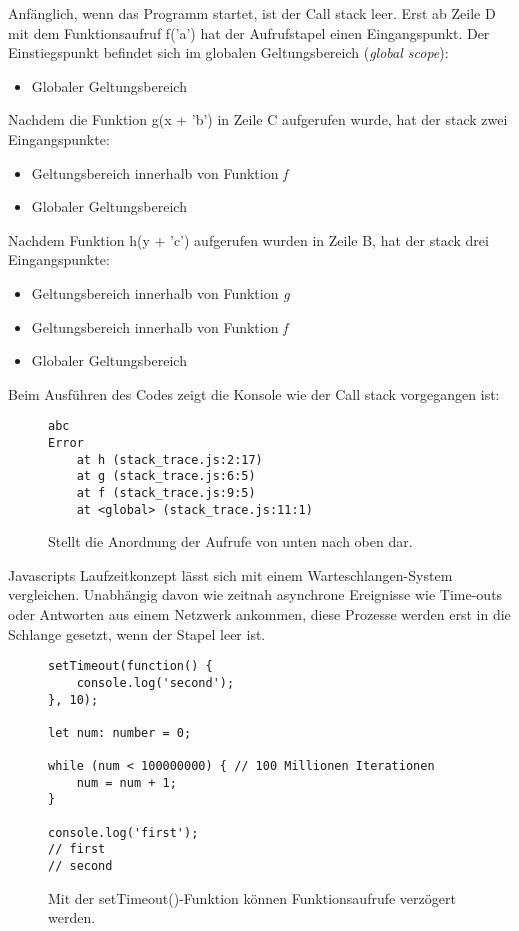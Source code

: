 \noindent
Anfänglich, wenn das Programm startet, ist der Call stack leer. Erst ab Zeile D mit dem Funktionsaufruf f('a') hat der Aufrufstapel einen Eingangspunkt. Der Einstiegspunkt befindet sich im globalen Geltungsbereich (\textit{global scope}):

\begin{itemize}
\item Globaler Geltungsbereich
\end{itemize}

\noindent
Nachdem die Funktion g(x + 'b') in Zeile C aufgerufen wurde, hat der stack zwei Eingangspunkte:

\begin{itemize}
\item Geltungsbereich innerhalb von Funktion \textit{f}
\item Globaler Geltungsbereich
\end{itemize}

\noindent
Nachdem Funktion h(y + 'c') aufgerufen wurden in Zeile B, hat der stack drei Eingangspunkte:

\begin{itemize}
\item Geltungsbereich innerhalb von Funktion \textit{g}
\item Geltungsbereich innerhalb von Funktion \textit{f}
\item Globaler Geltungsbereich
\end{itemize}

\noindent
Beim Ausführen des Codes zeigt die Konsole wie der Call stack vorgegangen ist:

\begin{figure}[H]
\begin{lstlisting}
abc
Error
    at h (stack_trace.js:2:17)
    at g (stack_trace.js:6:5)
    at f (stack_trace.js:9:5)
    at <global> (stack_trace.js:11:1)
\end{lstlisting}
\caption{Stellt die Anordnung der Aufrufe von unten nach oben dar.}
\label{stack-trace-error}
\end{figure}

\noindent
Javascripts Laufzeitkonzept lässt sich mit einem Warteschlangen-System vergleichen. Unabhängig davon wie zeitnah asynchrone Ereignisse wie Time-outs oder Antworten aus einem Netzwerk ankommen, diese Prozesse werden erst in die Schlange gesetzt, wenn der Stapel leer ist.

\begin{figure}[H]
\begin{lstlisting}[basicstyle=\small]
setTimeout(function() {
    console.log('second');
}, 10);

let num: number = 0;

while (num < 100000000) { // 100 Millionen Iterationen
    num = num + 1;
}

console.log('first');
// first
// second
\end{lstlisting}
\caption{Mit der setTimeout()-Funktion können Funktionsaufrufe verzögert werden.}
\label{First-timeout-example}
\end{figure}

